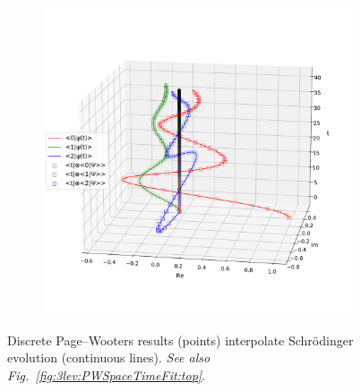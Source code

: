 \begin{figure}[p] %
  \begin{leftfullpage}
    \begin{subfigure}{\textwidth}
      \includegraphics[width=\textwidth]{img/3ldetect/PWSpaceTimeFit_side.pdf}
      \label{fig:3lev:PWSpaceTimeFit:side}
    \end{subfigure}
    \caption{
      Discrete Page--Wooters results (points)
      interpolate
      Schr\"{o}dinger
      evolution (continuous lines).
      \textit{See also Fig.~\ref{fig:3lev:PWSpaceTimeFit:top}}.
    }
  \end{leftfullpage}
\end{figure}
